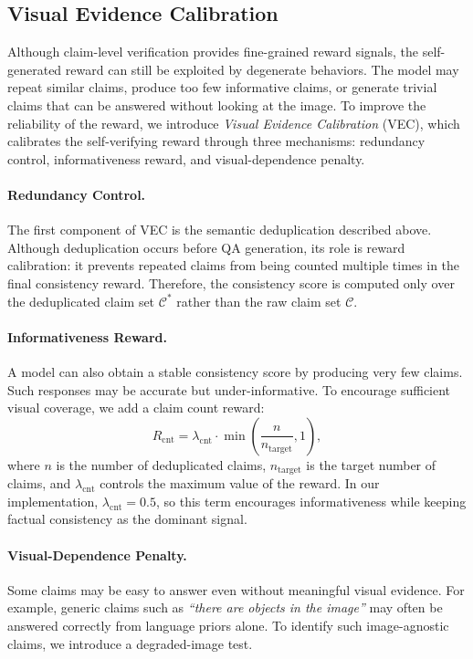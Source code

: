 \subsection{Visual Evidence Calibration}
\label{sec:vec}

Although claim-level verification provides fine-grained reward signals, the
self-generated reward can still be exploited by degenerate behaviors. The model
may repeat similar claims, produce too few informative claims, or generate
trivial claims that can be answered without looking at the image. To improve the
reliability of the reward, we introduce \textit{Visual Evidence Calibration}
(VEC), which calibrates the self-verifying reward through three mechanisms:
redundancy control, informativeness reward, and visual-dependence penalty.

\paragraph{Redundancy Control.}
The first component of VEC is the semantic deduplication described above.
Although deduplication occurs before QA generation, its role is reward
calibration: it prevents repeated claims from being counted multiple times in
the final consistency reward. Therefore, the consistency score is computed only
over the deduplicated claim set $\mathcal{C}^{\ast}$ rather than the raw claim
set $\mathcal{C}$.

\paragraph{Informativeness Reward.}
A model can also obtain a stable consistency score by producing very few claims.
Such responses may be accurate but under-informative. To encourage sufficient
visual coverage, we add a claim count reward:
\begin{equation}
    R_{\mathrm{cnt}}
    =
    \lambda_{\mathrm{cnt}}
    \cdot
    \min
    \left(
    \frac{n}{n_{\mathrm{target}}},
    1
    \right),
\end{equation}
where $n$ is the number of deduplicated claims,
$n_{\mathrm{target}}$ is the target number of claims, and
$\lambda_{\mathrm{cnt}}$ controls the maximum value of the reward. In our
implementation, $\lambda_{\mathrm{cnt}}=0.5$, so this term encourages
informativeness while keeping factual consistency as the dominant signal.

\paragraph{Visual-Dependence Penalty.}
Some claims may be easy to answer even without meaningful visual evidence. For
example, generic claims such as \textit{``there are objects in the image''} may
often be answered correctly from language priors alone. To identify such
image-agnostic claims, we introduce a degraded-image test.


